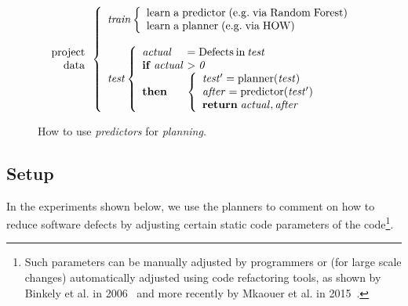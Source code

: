\documentclass{sig-alternate}
\begin{document}
  
\begin{figure}[!t]
\small 
\[
\begin{array}{r}
\mathrm{project}\\
\mathrm{data}
\end{array} 
\left\{\begin{array}{l}\mathit{train}
        \left\{\begin{array}{l}
                \mathrm{learn\;a\;}\mathrm{predictor\;}\mathrm{(e.g.\;via \;Random\;Forest)}\\
                \mathrm{learn\;a\;}\mathrm{planner\;}\mathrm{(e.g.\;via \; HOW)}
              \end{array}\right.
       \\
      ~\\
\mathit{test}  
    \left\{\begin{array}{l@{~}l}
           \mathit{actual}& =\mathrm{Defects \hspace{2pt} in \hspace{2pt}}\mathit{test}\\
           \mathrm{\bf if\;}\mathit{actual} & >  \mathit{0}\\
           \mathrm{\bf then} &
           \left\{
            \begin{array}{l}
                \mathit{test'} = \mathrm{planner}(\mathit{test})\\
                \mathit{after} =\mathrm{predictor}(\mathit{test'})\\ 
                \mathrm{{\bf return}\;} \mathit{actual},\mathit{after}
            \end{array}
          \right.
   \end{array}\right.
\end{array} \right. 
\]
 
\caption{How to use {\em predictors} for {\em planning}.}\label{fig:work}
\end{figure}


\subsection{Setup}

In the experiments shown below,  we use the planners to comment on how to reduce
software defects by adjusting certain static code parameters of the code\footnote{Such parameters can be manually adjusted by programmers or (for large scale changes) automatically adjusted using code refactoring
tools, as shown by Binkely et al. in 2006~\cite{Binkley2006} and more recently by Mkaouer et al. in 2015~\cite{Mkaouer15}.}.
\end{document}
